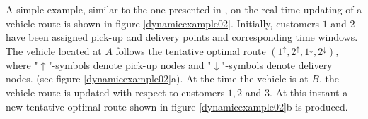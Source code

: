 \documentclass[dissertation,draft*]{aaltoseries}
\begin{document}
A simple example, similar to the one presented in \cite{psaraftis01},
on the real-time updating of a vehicle route %
is shown in figure \ref{dynamicexample02}.
Initially, customers $1$ and $2$ have been assigned 
pick-up and delivery points and corresponding time windows. The vehicle located at $A$ follows the
tentative optimal route $(1^{\uparrow},2^{\uparrow},1^{\downarrow},2^{\downarrow})$,
where "$\uparrow$"-symbols denote pick-up nodes and "$\downarrow$"-symbols denote delivery nodes. 
(see figure \ref{dynamicexample02}a).
At the time the vehicle is at $B$, the vehicle route is updated with respect 
to customers $1,2$ and $3$. At this instant %
a new tentative optimal route shown in figure \ref{dynamicexample02}b is produced. 
\end{document}
